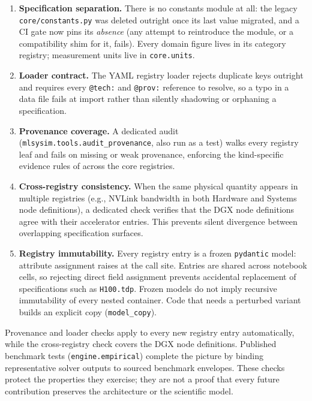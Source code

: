 \documentclass[10pt,twocolumn]{article}
\begin{document}
\begin{enumerate}[leftmargin=*,itemsep=2pt]
\item \textbf{Specification separation.} There is no constants module at all: the legacy \texttt{core/constants.py} was deleted outright once its last value migrated, and a CI gate now pins its \emph{absence} (any attempt to reintroduce the module, or a compatibility shim for it, fails). Every domain figure lives in its category registry; measurement units live in \texttt{core.units}.
\item \textbf{Loader contract.} The YAML registry loader rejects duplicate keys outright and requires every \texttt{@tech:} and \texttt{@prov:} reference to resolve, so a typo in a data file fails at import rather than silently shadowing or orphaning a specification.
\item \textbf{Provenance coverage.} A dedicated audit (\texttt{mlsysim.tools.audit\_provenance}, also run as a test) walks every registry leaf and fails on missing or weak provenance, enforcing the kind-specific evidence rules of  across the core registries.
\item \textbf{Cross-registry consistency.} When the same physical quantity appears in multiple registries (e.g., NVLink bandwidth in both Hardware and Systems node definitions), a dedicated check verifies that the DGX node definitions agree with their accelerator entries. This prevents silent divergence between overlapping specification surfaces.
\item \textbf{Registry immutability.} Every registry entry is a frozen \texttt{pydantic} model: attribute assignment raises at the call site. Entries are shared across notebook cells, so rejecting direct field assignment prevents accidental replacement of specifications such as \texttt{H100.tdp}. Frozen models do not imply recursive immutability of every nested container. Code that needs a perturbed variant builds an explicit copy (\texttt{model\_copy}).
\end{enumerate}

Provenance and loader checks apply to every new registry entry automatically, while the cross-registry check covers the DGX node definitions. Published benchmark tests (\texttt{engine.empirical}) complete the picture by binding representative solver outputs to sourced benchmark envelopes. These checks protect the properties they exercise; they are not a proof that every future contribution preserves the architecture or the scientific model.
\end{document}
